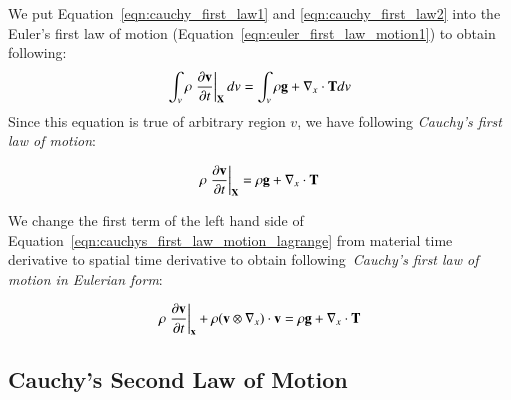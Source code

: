 We put Equation~\eqref{eqn:cauchy_first_law1} and \eqref{eqn:cauchy_first_law2} into the Euler's first law of motion (Equation~\eqref{eqn:euler_first_law_motion1}) to obtain following:
%
\begin{equation}
\int_v \rho \left. \frac{\partial {\mathbf{v}}}{\partial t} \right|_{\mathbf{X}} dv	
=\int_v \rho {\mathbf{g}} + \nabla_x \cdot {\mathbf{T}} dv 
\end{equation}
%
Since this equation is true of arbitrary region $v$, we have following \emph{Cauchy's first law of motion}:
%
\begin{tcolorbox}[title=Cauchy's first law of motion (Lagrangian form)]
\begin{equation}
\label{eqn:cauchys_first_law_motion_lagrange}
\rho \left.\frac{\partial {\mathbf{v}}}{\partial t} \right|_{\mathbf{X}}	
=\rho {\mathbf{g}} + \nabla_x \cdot {\mathbf{T}}
\end{equation}
\end{tcolorbox}
%
We change the first term of the left hand side of Equation~\eqref{eqn:cauchys_first_law_motion_lagrange} from material time derivative to spatial time derivative to obtain following~\emph{Cauchy's first law of motion in Eulerian form}:
%
\begin{tcolorbox}[title=Cauchy's first law of motion (Eulerian form)]
\begin{equation}
\rho \left.\frac{\partial\mathbf{v}}{\partial{t}} \right|_{\mathbf{x}} + \rho ( {\mathbf{v}} \otimes \nabla_x ) \cdot {\mathbf{v}} 
=\rho {\mathbf{g}} + \nabla_x \cdot {\mathbf{T}} 
\end{equation}
\end{tcolorbox}





\subsection{Cauchy's Second Law of Motion}

